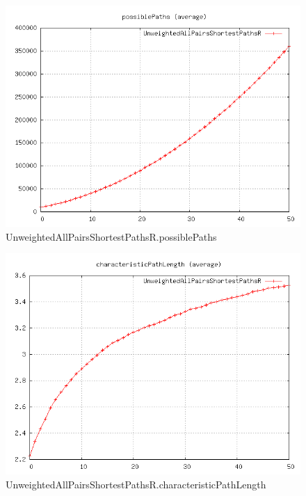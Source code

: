 \begin{figure} [h]
	\centering
	\includegraphics [scale=0.8] {plots/UnweightedAllPairsShortestPathsR.possiblePaths}
	\caption{UnweightedAllPairsShortestPathsR.possiblePaths}
	\label{plot:RANDOM_100_500 - BARABASI_ALBERT_GROWTH_10_2.UnweightedAllPairsShortestPathsR.possiblePaths}
\end{figure}

\begin{figure} [h]
	\centering
	\includegraphics [scale=0.8] {plots/UnweightedAllPairsShortestPathsR.characteristicPathLength}
	\caption{UnweightedAllPairsShortestPathsR.characteristicPathLength}
	\label{plot:RANDOM_100_500 - BARABASI_ALBERT_GROWTH_10_2.UnweightedAllPairsShortestPathsR.characteristicPathLength}
\end{figure}

